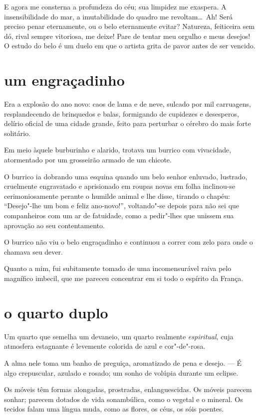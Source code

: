 E agora me consterna a profundeza do céu; sua limpidez me exaspera. A
insensibilidade do mar, a imutabilidade do quadro me revoltam\ldots\ 
Ah! Será preciso penar eternamente, ou o belo eternamente evitar?
Natureza, feiticeira sem dó, rival sempre vitoriosa, me deixe!
Pare de tentar meu orgulho e meus desejos! O estudo do belo é um duelo
em que o artista grita de pavor antes de ser vencido.

\quebra\section[Um engraçadinho]{um engraçadinho}

Era a explosão do ano novo: caos de lama e de neve, sulcado por mil
carruagens, resplandecendo de brinquedos e balas, formigando de
cupidezes e desesperos, delírio oficial de uma cidade grande, feito
para perturbar o cérebro do mais forte solitário.

Em meio àquele burburinho e alarido, trotava um burrico com
vivacidade, atormentado por um grosseirão armado de um chicote.

O burrico ia dobrando uma esquina quando um belo senhor enluvado,
lustrado, cruelmente engravatado e aprisionado em roupas novas em folha
inclinou-se cerimoniosamente perante o humilde animal e lhe disse,
tirando o chapéu: “Desejo"-lhe um bom e feliz ano-novo!”, 
voltando"-se depois para não sei que companheiros
com um ar de fatuidade, como a pedir"-lhes que unissem sua aprovação
ao seu contentamento.

O burrico não viu o belo engraçadinho e continuou a correr com zelo para
onde o chamava seu dever.

Quanto a mim, fui subitamente tomado de uma incomensurável raiva pelo
magnífico imbecil, que me pareceu concentrar em si todo o espírito da
França.

\quebra\section[O quarto duplo]{o quarto duplo}

Um quarto que semelha um devaneio, um quarto realmente \textit{espiritual}, cuja
atmosfera estagnante é levemente colorida de azul e cor"-de"-rosa.

A alma nele toma um banho de preguiça, aromatizado de pena e
desejo. --- É algo crepuscular, azulado e rosado; um sonho de volúpia durante um
eclipse.

Os móveis têm formas alongadas, prostradas, enlanguescidas. Os
móveis parecem sonhar; parecem dotados de vida
sonambúlica, como o vegetal e o mineral. Os tecidos falam uma língua
muda, como as flores, os céus, os sóis poentes.

